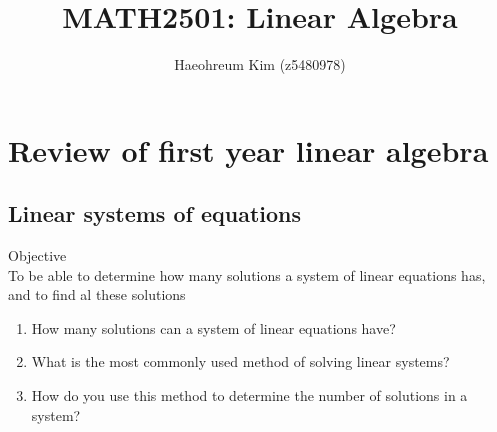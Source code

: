 \documentclass[journal, letterpaper]{IEEEtran}
\begin{document}
\title{MATH2501: Linear Algebra}
\author{Haeohreum Kim (z5480978)}
\maketitle
\section{Review of first year linear algebra}
\subsection{Linear systems of equations}
\begin{mybox}{Objective} \\ 
    To be able to determine how many solutions a system of 
    linear equations has, and to find al these solutions
    \begin{enumerate}
        \item How many solutions can a system of linear equations have?
        \item What is the most commonly used method of solving linear systems?
        \item How do you use this method to determine the number of solutions in a system?
    \end{enumerate}
\end{mybox}
\end{document}
